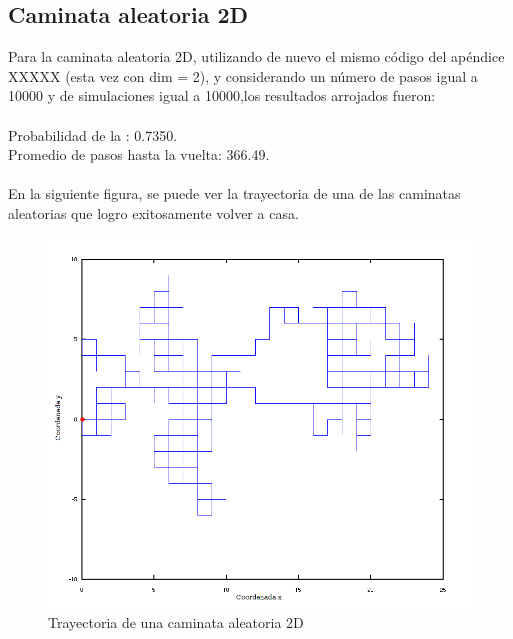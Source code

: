 \documentclass[a4paper,10pt]{article}
\begin{document}
\subsection*{Caminata aleatoria 2D}
Para la caminata aleatoria 2D, utilizando de nuevo el mismo c\'odigo del ap\'endice XXXXX (esta vez con dim = 2), y considerando
 un n\'umero de pasos igual a 10000 y de simulaciones igual a 10000,los resultados arrojados fueron:
\\
\\ Probabilidad de la : 0.7350.
\\ Promedio de pasos hasta la vuelta: 366.49.
\\
\\ En la siguiente figura, se puede ver la trayectoria de una de las caminatas aleatorias que logro exitosamente volver a casa.
\begin{center}
  \begin{figure}[H]
  \includegraphics[scale=0.5]{./images/rec2edit.png}
    \caption{Trayectoria de una caminata aleatoria 2D}
  \end{figure}
\end{center} 
\end{document}
